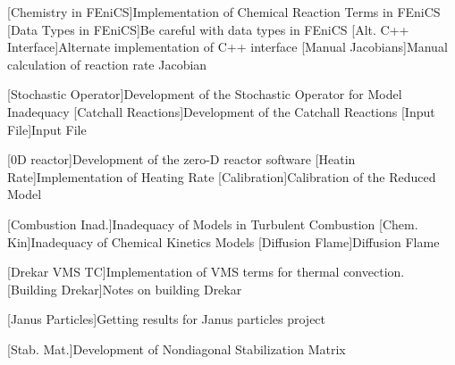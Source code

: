 

[Chemistry in FEniCS]{Implementation of Chemical Reaction Terms in FEniCS}
[Data Types in FEniCS]{Be careful with data types in FEniCS}
[Alt. C++ Interface]{Alternate implementation of C++ interface}
[Manual Jacobians]{Manual calculation of reaction rate Jacobian}

[Stochastic Operator]{Development of the Stochastic Operator for Model Inadequacy}
[Catchall Reactions]{Development of the Catchall Reactions}
[Input File]{Input File}

[0D reactor]{Development of the zero-D reactor software}
[Heatin Rate]{Implementation of Heating Rate}
[Calibration]{Calibration of the Reduced Model}

[Combustion Inad.]{Inadequacy of Models in Turbulent Combustion}
[Chem. Kin]{Inadequacy of Chemical Kinetics Models}
[Diffusion Flame]{Diffusion Flame}

[Drekar VMS TC]{Implementation of VMS terms for thermal convection.}
[Building Drekar]{Notes on building Drekar}

[Janus Particles]{Getting results for Janus particles project}

[Stab. Mat.]{Development of Nondiagonal Stabilization Matrix}

